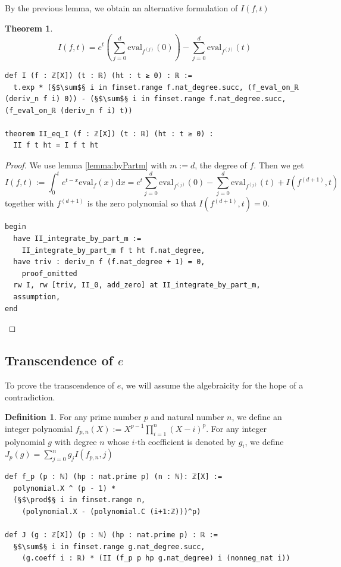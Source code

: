 \documentclass{report}
\theoremstyle{definition}
\newtheorem{theorem}{Theorem}[section]
\newtheorem{definition}{Definition}[section]
\begin{document}
By the previous lemma, we obtain an alternative formulation of $I(f, t)$
\begin{theorem}\label{lemma:II_eq_I}
$$
I(f,t)=e^t\left(\sum_{j=0}^d \mathrm{eval}_{f^{(j)}}(0)\right)-\sum_{j=0}^d\mathrm{eval}_{f^{(j)}}(t)
$$

\begin{verbatim}
def I (f : ℤ[X]) (t : ℝ) (ht : t ≥ 0) : ℝ := 
  t.exp * (§$\sum$§ i in finset.range f.nat_degree.succ, (f_eval_on_ℝ (deriv_n f i) 0)) - (§$\sum$§ i in finset.range f.nat_degree.succ, (f_eval_on_ℝ (deriv_n f i) t))

theorem II_eq_I (f : ℤ[X]) (t : ℝ) (ht : t ≥ 0) : 
  II f t ht = I f t ht
\end{verbatim}
\end{theorem}
\begin{proof}
We use lemma \ref{lemma:byPartm} with $m:=d$, the degree of $f$. Then we get
$$
I(f,t):=\int_0^t e^{t-x}\mathrm{eval}_f(x)\mathrm{d}x=e^t\sum_{j=0}^d\mathrm{eval}_{f^{(j)}}(0)-\sum_{j=0}^d\mathrm{eval}_{f^{(j)}}(t)+I(f^{(d+1)}, t)
$$
together with $f^{(d+1)}$ is the zero polynomial so that $I(f^{(d+1)},t)=0$.
\begin{verbatim}
begin
  have II_integrate_by_part_m := 
    II_integrate_by_part_m f t ht f.nat_degree,
  have triv : deriv_n f (f.nat_degree + 1) = 0, 
    proof_omitted
  rw I, rw [triv, II_0, add_zero] at II_integrate_by_part_m,
  assumption,
end
\end{verbatim}
\end{proof}

\subsection*{Transcendence of $e$}

To prove the transcendence of $e$, we will assume the algebraicity for the hope of a contradiction.

\begin{definition}
For any prime number $p$ and natural number $n$, we define an integer polynomial $f_{p,n}(X):=X^{p-1}\prod_{i=1}^n(X-i)^p$. For any integer polynomial $g$ with degree $n$ whose $i$-th coefficient is denoted by $g_i$, we define $J_{p}(g)=\sum_{j=0}^ng_j I(f_{p,n}, j)$

\begin{verbatim}
def f_p (p : ℕ) (hp : nat.prime p) (n : ℕ): ℤ[X] := 
  polynomial.X ^ (p - 1) * 
  (§$\prod$§ i in finset.range n, 
    (polynomial.X - (polynomial.C (i+1:ℤ)))^p)

def J (g : ℤ[X]) (p : ℕ) (hp : nat.prime p) : ℝ := 
  §$\sum$§ i in finset.range g.nat_degree.succ, 
    (g.coeff i : ℝ) * (II (f_p p hp g.nat_degree) i (nonneg_nat i))
\end{verbatim}
\end{definition}
\end{document}
